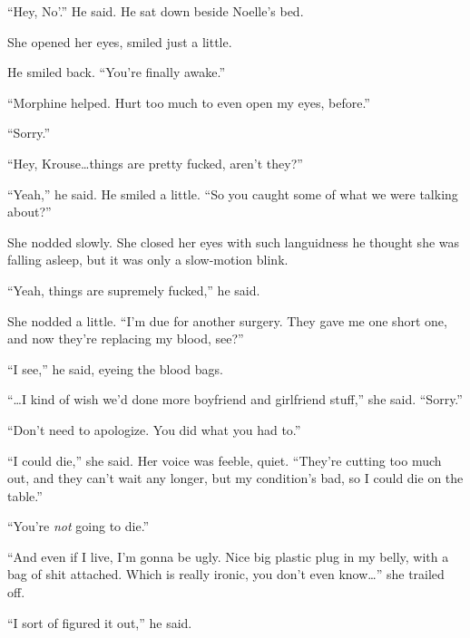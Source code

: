 ``Hey, No'.'' He said.  He sat down beside Noelle's bed.



She opened her eyes, smiled just a little.



He smiled back.  ``You're finally awake.''



``Morphine helped.  Hurt too much to even open my eyes, before.''



``Sorry.''



``Hey, Krouse\ldots things are pretty fucked, aren't they?''



``Yeah,'' he said.  He smiled a little.  ``So you caught some of what we were talking about?''



She nodded slowly.  She closed her eyes with such languidness he thought she was falling asleep, but it was only a slow-motion blink.



``Yeah, things are supremely fucked,'' he said.



She nodded a little.  ``I'm due for another surgery.  They gave me one short one, and now they're replacing my blood, see?''



``I see,'' he said, eyeing the blood bags.



``\ldots{}I kind of wish we'd done more boyfriend and girlfriend stuff,'' she said.  ``Sorry.''



``Don't need to apologize.  You did what you had to.''



``I could die,'' she said.  Her voice was feeble, quiet.  ``They're cutting too much out, and they can't wait any longer, but my condition's bad, so I could die on the table.''



``You're \emph{not} going to die.''



``And even if I live, I'm gonna be ugly.  Nice big plastic plug in my belly, with a bag of shit attached.  Which is really ironic, you don't even know\ldots'' she trailed off.



``I sort of figured it out,'' he said.



